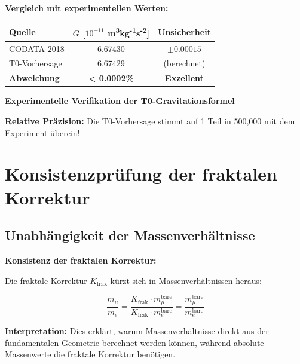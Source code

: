 	\begin{verification}
		\textbf{Vergleich mit experimentellen Werten:}
		
		\begin{center}
			\begin{tabular}{lcc}
				\toprule
				\textbf{Quelle} & \textbf{$G$ [$10^{-11}$ m\textsuperscript{3}kg\textsuperscript{-1}s\textsuperscript{-2}]} & \textbf{Unsicherheit} \\
				\midrule
				CODATA 2018 & 6.67430 & $\pm 0.00015$ \\
				T0-Vorhersage & 6.67429 & (berechnet) \\
				\textbf{Abweichung} & \textbf{< 0.0002\%} & \textbf{Exzellent} \\
				\bottomrule
			\end{tabular}
		\end{center}
		
		\textbf{Experimentelle Verifikation der T0-Gravitationsformel}
		
		\textbf{Relative Präzision:} Die T0-Vorhersage stimmt auf 1 Teil in 500,000 mit dem Experiment überein!
	\end{verification}
	
	\section{Konsistenzprüfung der fraktalen Korrektur}
	
	\subsection{Unabhängigkeit der Massenverhältnisse}
	
	\begin{keyresult}
		\textbf{Konsistenz der fraktalen Korrektur:}
		
		Die fraktale Korrektur $K_{\text{frak}}$ kürzt sich in Massenverhältnissen heraus:
		
		\begin{equation}
			\frac{m_\mu}{m_e} = \frac{K_{\text{frak}} \cdot m_\mu^{\text{bare}}}{K_{\text{frak}} \cdot m_e^{\text{bare}}} = \frac{m_\mu^{\text{bare}}}{m_e^{\text{bare}}}
		\end{equation}
		
		\textbf{Interpretation:} 
		Dies erklärt, warum Massenverhältnisse direkt aus der fundamentalen Geometrie berechnet werden können, während absolute Massenwerte die fraktale Korrektur benötigen.
	\end{keyresult}
	
